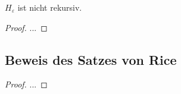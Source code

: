 \documentclass[journal]{IEEEtran}
\begin{document}
    \begin{theorem}
      $H_\varepsilon$ ist nicht rekursiv.
    \end{theorem}
    \begin{proof}
      ...
    \end{proof}

  \subsection{Beweis des Satzes von Rice}\label{proof_rice}

    \begin{proof}
      ...
    \end{proof}



%




\ifCLASSOPTIONcaptionsoff{}
  \newpage
\fi
\end{document}

